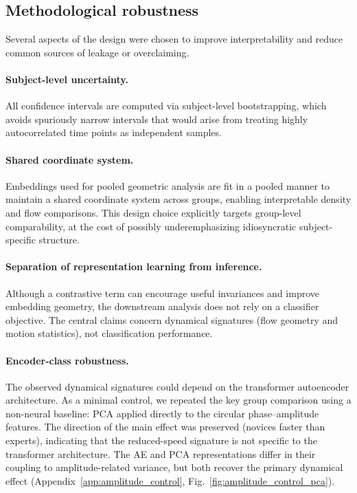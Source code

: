 \documentclass[5p,twocolumn,authoryear]{elsarticle}
\newcommand{\figref}[1]{Fig.~\ref{#1}}
\begin{document}
\subsection{Methodological robustness}
Several aspects of the design were chosen to improve interpretability and reduce common sources of leakage or overclaiming.

\paragraph{Subject-level uncertainty.}
All confidence intervals are computed via subject-level bootstrapping, which avoids spuriously narrow intervals that would arise from treating highly autocorrelated time points as independent samples.

\paragraph{Shared coordinate system.}
Embeddings used for pooled geometric analysis are fit in a pooled manner to maintain a shared coordinate system across groups, enabling interpretable density and flow comparisons. This design choice explicitly targets group-level comparability, at the cost of possibly underemphasizing idiosyncratic subject-specific structure.

\paragraph{Separation of representation learning from inference.}
Although a contrastive term can encourage useful invariances and improve embedding geometry, the downstream analysis does not rely on a classifier objective. The central claims concern dynamical signatures (flow geometry and motion statistics), not classification performance.

\paragraph{Encoder-class robustness.}
The observed dynamical signatures could depend on the transformer autoencoder architecture. As a minimal control, we repeated the key group comparison using a non-neural baseline: PCA applied directly to the circular phase--amplitude features. The direction of the main effect was preserved (novices faster than experts), indicating that the reduced-speed signature is not specific to the transformer architecture. The AE and PCA representations differ in their coupling to amplitude-related variance, but both recover the primary dynamical effect (Appendix~\ref{app:amplitude_control}, \figref{fig:amplitude_control_pca}).
\end{document}
